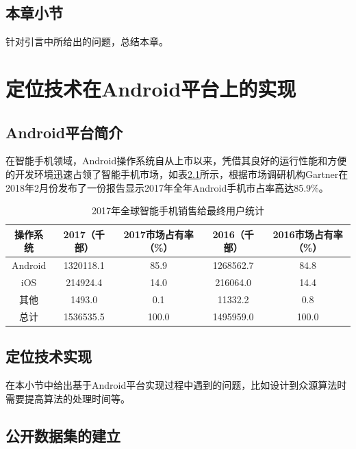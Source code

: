 \section{本章小节}

针对引言中所给出的问题，总结本章。




\chapter{定位技术在Android平台上的实现}

\section{Android平台简介}

在智能手机领域，Android操作系统自从上市以来，凭借其良好的运行性能和方便的开发环境迅速占领了智能手机市场，如表\ref{tab-61}所示，根据市场调研机构Gartner在2018年2月份发布了一份报告显示2017年全年Android手机市占率高达85.9\%\cite{gartner-smartphone-2017}。


\begin{table} [thb]
	\caption{2017年全球智能手机销售给最终用户统计}\label{tab-61}
	\small
	\centering
	{
		\begin{tabular}{c c c c c}
			\toprule
			操作系统 & 2017（千部） & 2017市场占有率（\%） & 2016（千部） & 2016市场占有率（\%）\\
			\midrule
			Android & 1320118.1 & 85.9 & 1268562.7 & 84.8\\
			iOS & 214924.4 & 14.0 & 216064.0 & 14.4\\
			其他 & 1493.0 & 0.1 & 11332.2 & 0.8\\
			总计 & 1536535.5 & 100.0 & 1495959.0 & 100.0\\			
			\bottomrule
		\end{tabular}
	}
\end{table}


\section{定位技术实现}

在本小节中给出基于Android平台实现过程中遇到的问题，比如设计到众源算法时需要提高算法的处理时间等。

\section{公开数据集的建立}


